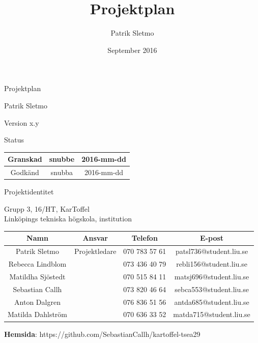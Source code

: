 \documentclass{article}
\title{Projektplan}
\author{Patrik Sletmo}
\date{September 2016}
\begin{document}
\graphicspath{{./images/}}

\thispagestyle{empty}

{
\sffamily
\centering
\large


{\huge 
Projektplan
}

{\large
Patrik Sletmo
}

{\large
Version x.y
}

\vspace{13.5cm}

Status
\begin{center}
\begin{tabular}{ | c | c | c | } 
\hline
Granskad & snubbe & 2016-mm-dd \\
\hline
Godkänd & snubba & 2016-mm-dd\\
\hline
\end{tabular}
\end{center}
}

\clearpage

\vspace*{\fill}
{
\sffamily
\centering
\large


{\huge 
Projektidentitet
}

{\large
Grupp 3, 16/HT, KarToffel \\ Linköpings tekniska högskola, institution 
}

\vspace{0.5cm}

\begin{table}[H]
\centering
\begin{tabular}{ | c | c | c | c |} 
\hline
Namn & Ansvar & Telefon & E-post \\  
\hline
Patrik Sletmo & Projektledare & 070 783 57 61 & patsl736@student.liu.se \\
\hline
Rebecca Lindblom &  & 073 436 40 79 & rebli156@student.liu.se \\
\hline
Matildha Sjöstedt &  & 070 515 84 11 & matsj696@student.liu.se \\
\hline
Sebastian Callh &  & 073 820 46 64 & sebca553@student.liu.se \\
\hline
Anton Dalgren &  & 076 836 51 56 & antda685@student.liu.se \\
\hline
Matilda Dahlström &  & 070 636 33 52 & matda715@student.liu.se \\
\hline
\end{tabular}
\end{table}
}

\begin{center}
\textbf{Hemsida}: https://github.com/SebastianCallh/kartoffel-tsea29
\end{center}
\end{document}
